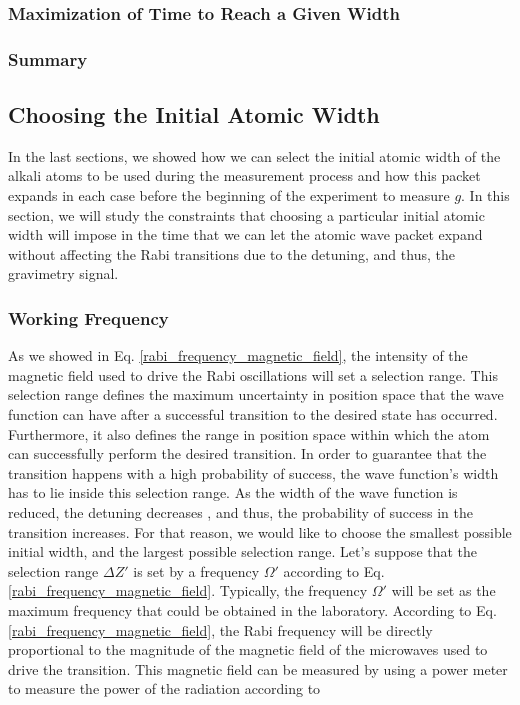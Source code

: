 \documentclass{article}
\begin{document}
\subsubsection{Maximization of Time to Reach a Given Width}

\subsubsection{Summary}

\subsection{Choosing the Initial Atomic Width}
In the last sections, we showed how we can select the initial atomic width of the alkali atoms to be used during the measurement process and how this packet expands in each case before the beginning of the experiment to measure $g$. In this section, we will study the constraints that choosing a particular initial atomic width will impose in the time that we can let the atomic wave packet expand without affecting the Rabi transitions due to the detuning, and thus, the gravimetry signal.

\subsubsection{Working Frequency}
As we showed in Eq. \ref{rabi_frequency_magnetic_field}, the intensity of the magnetic field used to drive the Rabi oscillations will set a selection range. This selection range defines the maximum uncertainty in position space that the wave function can have after a successful transition to the desired state has occurred. Furthermore, it also defines the range in position space within which the atom can successfully perform the desired transition. In order to guarantee that the transition happens with a high probability of success, the wave function's width has to lie inside this selection range. As the width of the wave function is reduced, the detuning decreases , and thus, the probability of success in the transition increases. For that reason, we would like to choose the smallest possible initial width, and the largest possible selection range. Let's suppose that the selection range $\Delta Z'$ is set by a frequency $\Omega'$ according to Eq. \ref{rabi_frequency_magnetic_field}.
Typically, the frequency $\Omega'$ will be set as the maximum frequency that could be obtained in the laboratory. According to Eq. \ref{rabi_frequency_magnetic_field}, the Rabi frequency will be directly proportional to the magnitude of the magnetic field of the microwaves used to drive the transition. This magnetic field can be measured by using a power meter to measure the power of the radiation according to
\end{document}

